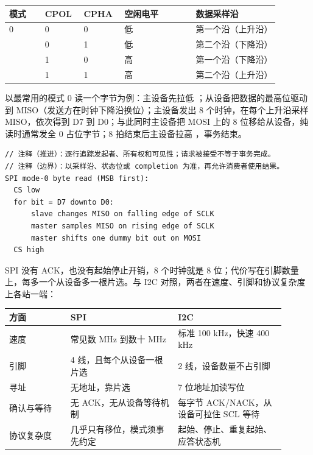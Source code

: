 \begin{longtable}{L{0.12\linewidth}L{0.12\linewidth}L{0.12\linewidth}L{0.24\linewidth}L{0.28\linewidth}}
\toprule
模式 & CPOL & CPHA & 空闲电平 & 数据采样沿 \\
 & 0 & 0 & 低 & 第一个沿（上升沿） \\ & 0 & 1 & 低 & 第二个沿（下降沿） \\ & 1 & 0 & 高 & 第一个沿（下降沿） \\ & 1 & 1 & 高 & 第二个沿（上升沿） \\
\bottomrule
\end{longtable}

以最常用的模式 0 读一个字节为例：主设备先拉低 ；从设备把数据的最高位驱动到 MISO（发送方在时钟下降沿换位）；主设备发出 8 个时钟，在每个上升沿采样 MISO，依次得到 D7 到 D0；与此同时主设备把 MOSI 上的 8 位移给从设备，纯读时通常发全 0 占位字节；8 拍结束后主设备拉高 ，事务结束。

\begin{lstlisting}
// 注释（推进）：逐行追踪发起者、所有权和可见性；请求被接受不等于事务完成。
// 注释（边界）：以采样沿、状态位或 completion 为准，再允许消费者使用结果。
SPI mode-0 byte read (MSB first):
  CS low
  for bit = D7 downto D0:
      slave changes MISO on falling edge of SCLK
      master samples MISO on rising edge of SCLK
      master shifts one dummy bit out on MOSI
  CS high
\end{lstlisting}

SPI 没有 ACK，也没有起始停止开销，8 个时钟就是 8 位；代价写在引脚数量上，每多一个从设备多一根片选。与 I2C 对照，两者在速度、引脚和协议复杂度上各站一端：

\begin{longtable}{L{0.20\linewidth}L{0.35\linewidth}L{0.35\linewidth}}
\toprule
方面 & SPI & I2C \\
\midrule
速度 & 常见数 MHz 到数十 MHz & 标准 100 kHz，快速 400 kHz \\\tablerowrule
引脚 & 4 线，且每个从设备一根片选 & 2 线，设备数量不占引脚 \\\tablerowrule
寻址 & 无地址，靠片选 & 7 位地址加读写位 \\\tablerowrule
确认与等待 & 无 ACK，无从设备等待机制 & 每字节 ACK/NACK，从设备可拉住 SCL 等待 \\\tablerowrule
协议复杂度 & 几乎只有移位，模式须事先约定 & 起始、停止、重复起始、应答状态机 \\
\bottomrule
\end{longtable}

